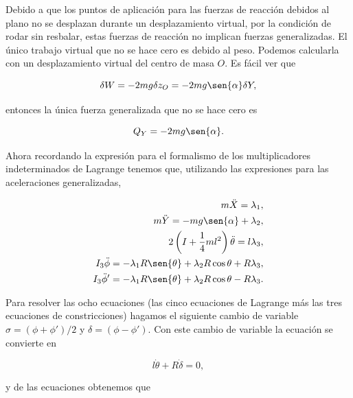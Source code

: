 \documentclass[a4paper,10pt]{article}
\numberwithin{equation}{section}
\begin{document}
\vspace{.3cm}

Debido a que los puntos de aplicación para las fuerzas de reacción 
debidos al plano no se desplazan durante un desplazamiento virtual, 
por la condición de rodar sin resbalar, estas fuerzas de reacción no 
implican fuerzas generalizadas. El único trabajo virtual que no 
se hace cero es debido al peso. Podemos calcularla con un desplazamiento 
virtual del centro de masa $O$. Es fácil ver que 

\begin{equation}
 \delta W = - 2mg \delta z_O = -2mg\sen{\alpha}\delta Y,
\end{equation}

entonces la única fuerza generalizada que no se hace cero es 

\begin{equation}
 Q_Y = -2mg\sen{\alpha}.
\end{equation}

Ahora recordando la expresión para el formalismo de los multiplicadores 
indeterminados de Lagrange tenemos que, utilizando las expresiones 
para las aceleraciones generalizadas,

\begin{align}
 \label{eq:1lagrange1}
 m\ddot{X} = \lambda_1, \\
 \label{eq:1lagrange2}
 m\ddot{Y} = - mg\sen{\alpha} + \lambda_2, \\
 \label{eq:1lagrange3}
 2\left( I + \frac{1}{4}ml^2\right) \ddot{\theta} = l\lambda_3, \\
 \label{eq:1lagrange4}
 I_3\ddot{\phi} = -\lambda_1 R\sen{\theta} + \lambda_2 R\cos{\theta} + R\lambda_3, \\
 \label{eq:1lagrange5}
 I_3\ddot{\phi}' = -\lambda_1 R\sen{\theta} + \lambda_2 R\cos{\theta} - R\lambda_3.
\end{align}

Para resolver las ocho ecuaciones (las cinco ecuaciones de Lagrange más las tres 
ecuaciones de constricciones) hagamos el siguiente cambio de variable 
$\sigma = (\phi + \phi')/2$ y $\delta = (\phi - \phi')$. Con este cambio de variable 
la ecuación  se convierte en 

\begin{equation}
 l\dot{\theta} + R\dot{\delta} = 0,
\end{equation}

y de las ecuaciones  obtenemos que 
\end{document}
